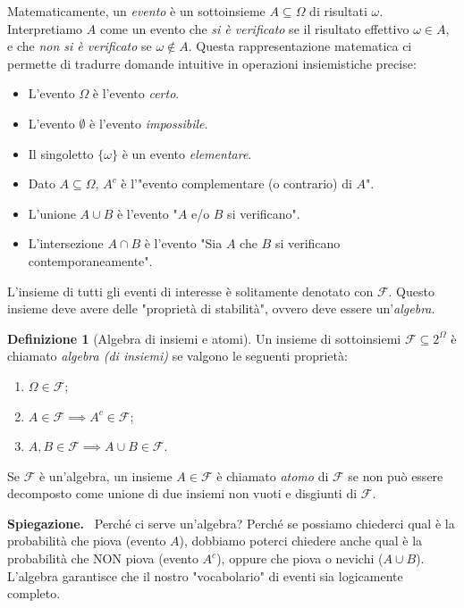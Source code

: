 \documentclass[11pt, a4paper]{report}
\theoremstyle{plain}
\theoremstyle{definition}
\newtheorem{definition}[theorem]{Definizione}
\theoremstyle{remark}
\newenvironment{spiegazione}[1][Spiegazione]
{\begin{mdframed}[backgroundcolor=green!5, linecolor=green!50, linewidth=2pt, topline=false, rightline=false, bottomline=false]
\textbf{\textsf{#1.}}\ }
{\end{mdframed}}
\newcommand{\F}{\mathcal{F}}
\newcommand{\1}{\mathbf{1}}
\begin{document}
Matematicamente, un \emph{evento} è un sottoinsieme $A \subseteq \Omega$ di risultati $\omega$. Interpretiamo $A$ come un evento che \emph{si è verificato} se il risultato effettivo $\omega \in A$, e che \emph{non si è verificato} se $\omega \notin A$. Questa rappresentazione matematica ci permette di tradurre domande intuitive in operazioni insiemistiche precise:
\begin{itemize}
    \item L'evento $\Omega$ è l'evento \emph{certo}.
    \item L'evento $\emptyset$ è l'evento \emph{impossibile}.
    \item Il singoletto $\{\omega\}$ è un evento \emph{elementare}.
    \item Dato $A \subseteq \Omega$, $A^c$ è l'"evento complementare (o contrario) di $A$".
    \item L'unione $A \cup B$ è l'evento "$A$ e/o $B$ si verificano".
    \item L'intersezione $A \cap B$ è l'evento "Sia $A$ che $B$ si verificano contemporaneamente".
\end{itemize}

L'insieme di tutti gli eventi di interesse è solitamente denotato con $\F$. Questo insieme deve avere delle "proprietà di stabilità", ovvero deve essere un'\emph{algebra}.

\begin{definition}[Algebra di insiemi e atomi]
Un insieme di sottoinsiemi $\F \subseteq 2^\Omega$ è chiamato \emph{algebra (di insiemi)} se valgono le seguenti proprietà:
\begin{enumerate}[(F1)]
    \item $\Omega \in \F$;
    \item $A \in \F \implies A^c \in \F$;
    \item $A, B \in \F \implies A \cup B \in \F$.
\end{enumerate}
Se $\F$ è un'algebra, un insieme $A \in \F$ è chiamato \emph{atomo} di $\F$ se non può essere decomposto come unione di due insiemi non vuoti e disgiunti di $\F$.
\end{definition}

\begin{spiegazione}
    Perché ci serve un'algebra? Perché se possiamo chiederci qual è la probabilità che piova (evento $A$), dobbiamo poterci chiedere anche qual è la probabilità che NON piova (evento $A^c$), oppure che piova o nevichi ($A \cup B$). L'algebra garantisce che il nostro "vocabolario" di eventi sia logicamente completo.
\end{spiegazione}
\end{document}
